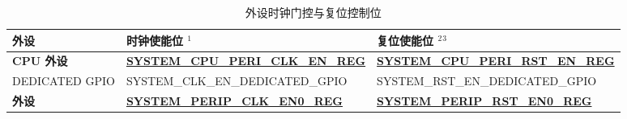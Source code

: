 \documentclass[main\_\_CN.tex]{subfiles}
\begin{document}
\begin{longtable}[c]{ |p{4cm}|p{6cm}|p{6cm}| }
\caption{外设时钟门控与复位控制位}
\label{table:peripheralcontrollingbit}
\\\hline\rowcolor{lightgray}
外设    & 时钟使能位 {\hyperref[table:reset_notes]{$^1$}} & 复位使能位 {\hyperref[table:reset_notes]{$^2$}}{\hyperref[table:reset_notes]{$^3$}}\\\hline
\textbf{CPU 外设} & \textbf{\hyperref[regdesc:SYSTEMCPUPERICLKENREG]{SYSTEM\_CPU\_PERI\_CLK\_EN\_REG}} & \textbf{\hyperref[regdesc:SYSTEMCPUPERIRSTENREG]{SYSTEM\_CPU\_PERI\_RST\_EN\_REG}} \\ \hline

DEDICATED GPIO & SYSTEM\_CLK\_EN\_DEDICATED\_GPIO & SYSTEM\_RST\_EN\_DEDICATED\_GPIO \\\hline

\textbf{外设} & \textbf{\hyperref[regdesc:SYSTEMPERIPCLKEN0REG]{SYSTEM\_PERIP\_CLK\_EN0\_REG}} & \textbf{\hyperref[regdesc:SYSTEMPERIPRSTEN0REG]{SYSTEM\_PERIP\_RST\_EN0\_REG}} \\ \hline


\end{longtable}
\end{document}
